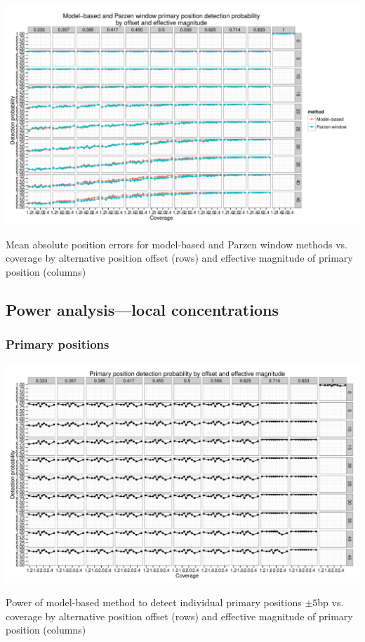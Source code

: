 \begin{FPfigure}
\centering
\includegraphics[page=5,width=0.95\textheight,angle=90]{figures/nucleosomes/plots_compare_power}
\caption{Mean absolute position errors for model-based and Parzen window methods vs. coverage by alternative position offset (rows) and effective magnitude of primary position (columns)}
\end{FPfigure}
\afterpage{\clearpage}

\clearpage

\subsection{Power analysis---local concentrations}
\label{supp:nucleosomes:sec:detection}

\subsubsection{Primary positions}

\begin{FPfigure}
\centering
\includegraphics[page=1,width=0.95\textheight,angle=90]{figures/nucleosomes/plots_power_pm3}
\caption{Power of model-based method to detect individual primary positions $\pm 5$bp vs. coverage by alternative position offset (rows) and effective magnitude of primary position (columns)}
\end{FPfigure}
\afterpage{\clearpage}

